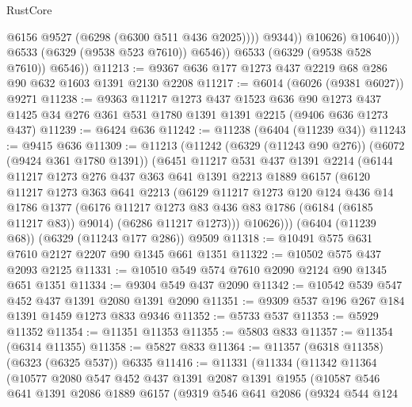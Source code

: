 \begin{lexlean}{RustCore}
\begin{coremodule}
                            @6156
                            @9527
                            (@6298 (@6300 @511 @436 @2025))))
                        @9344))
                    @10626)
                  @10640)))
            @6533
            (@6329 (@9538 @523 @7610))
            @6546))
        @6533
        (@6329 (@9538 @528 @7610))
        @6546))
@11213 := @9367 @636 @177 @1273 @437 @2219 @68 @286 @90 @632 @1603 @1391 @2130 @2208
@11217 := @6014 (@6026 (@9381 @6027)) @9271
@11238 := @9363
    @11217
    @1273
    @437
    @1523
    @636
    @90
    @1273
    @437
    @1425
    @34
    @276
    @361
    @531
    @1780
    @1391
    @1391
    @2215
    (@9406 @636 @1273 @437)
@11239 := @6424 @636
@11242 := @11238 (@6404 (@11239 @34))
@11243 := @9415 @636
@11309 := @11213
    (@11242
      (@6329 (@11243 @90 @276))
      (@6072 (@9424 @361 @1780 @1391))
      (@6451
        @11217
        @531
        @437
        @1391
        @2214
        (@6144
          @11217
          @1273
          @276
          @437
          @363
          @641
          @1391
          @2213
          @1889
          @6157
          (@6120
            @11217
            @1273
            @363
            @641
            @2213
            (@6129
              @11217
              @1273
              @120
              @124
              @436
              @14
              @1786
              @1377
              (@6176 @11217 @1273 @83 @436 @83 @1786 (@6184 (@6185 @11217 @83)) @9014)
              (@6286 @11217 @1273)))
          @10626)))
    (@6404 (@11239 @68))
    (@6329 (@11243 @177 @286))
    @9509
@11318 := @10491 @575 @631 @7610 @2127 @2207 @90 @1345 @661 @1351
@11322 := @10502 @575 @437 @2093 @2125
@11331 := @10510 @549 @574 @7610 @2090 @2124 @90 @1345 @651 @1351
@11334 := @9304 @549 @437 @2090
@11342 := @10542 @539 @547 @452 @437 @1391 @2080 @1391 @2090
@11351 := @9309 @537 @196 @267 @184 @1391 @1459 @1273 @833 @9346
@11352 := @5733 @537
@11353 := @5929 @11352
@11354 := @11351 @11353
@11355 := @5803 @833
@11357 := @11354 (@6314 @11355)
@11358 := @5827 @833
@11364 := @11357 (@6318 @11358) (@6323 (@6325 @537)) @6335
@11416 := @11331
    (@11334
      (@11342
        @11364
        (@10577
          @2080
          @547
          @452
          @437
          @1391
          @2087
          @1391
          @1955
          (@10587
            @546
            @641
            @1391
            @2086
            @1889
            @6157
            (@9319
              @546
              @641
              @2086
              (@9324
                @544
                @124

\end{coremodule}
\end{lexlean}
